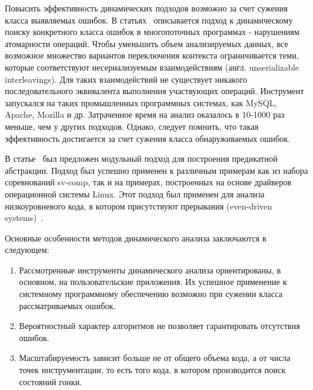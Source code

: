 Повысить эффективность динамических подходов возможно за счет сужения класса выявляемых ошибок.
В статьях~\cite{Park:2009:ASPLOS,Park:2009:SIGARCH,Park:2009} описывается подход к динамическому поиску конкретного класса ошибок в многопоточных программах - нарушениям атомарности операций.
Чтобы уменьшить объем анализируемых данных, все возможное множество вариантов переключения контекста ограничивается теми, которые соответствуют несериализуемым взаимодействиям (англ. unserializable interleavings).
Для таких взаимодействий не существует никакого последовательного эквивалента выполнения участвующих операций.
Инструмент запускался на таких промышленных программных системах, как MySQL, Apache, Mozilla и др.
Затраченное время на анализ оказалось в 10-1000 раз меньше, чем у других подходов. 
Однако, следует помнить, что такая эффективность достигается за счет сужения класса обнаруживаемых ошибок.

В статье~\cite{Kusano:2016:FCT} был предложен модульный подход для построения предикатной абстракции.
Подход был успешно применен к различным примерам как из набора соревнований sv-comp, так и на примерах, построенных на основе драйверов операционной системы Linux.
Этот подход был применен для анализа низкоуровневого кода, в котором присутствуют прерывания (even-driven systems)~\cite{Sung:2017}.

Основные особенности методов динамического анализа заключаются в следующем:
\begin{enumerate}
\item Рассмотренные инструменты динамического анализа ориентированы, в основном, на пользовательские приложения. 
Их успешное применение к системному программному обеспечению возможно при сужении класса рассматриваемых ошибок.
\item Вероятностный характер алгоритмов не позволяет гарантировать отсутствия ошибок.
\item Масштабируемость зависит больше не от общего объема кода, а от числа точек инструментации, то есть того кода, в котором производится поиск состояний гонки. 
\end{enumerate}


